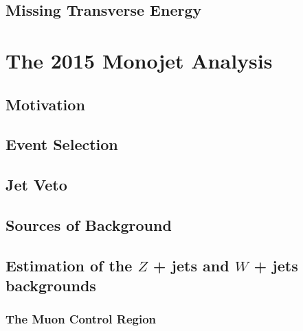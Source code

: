 \documentclass[10pt,twoside,cucitura,classica,english,openany]{toptesi}
\begin{document}


\section{Missing Transverse Energy}
\label{sec:miss-transv-energy}



\chapter{The 2015 Monojet Analysis}
\label{cha:monojet-signature}

\section{Motivation}
\label{sec:motivation}



\section{Event Selection}
\label{sec:event-selection}



\section{Jet Veto }
\label{sec:jet-veto}



\section{Sources of Background}
\label{sec:sources-background}



\section{Estimation of the $Z$ + jets and $W$ + jets backgrounds}
\label{sec:estimation-z-+}



\subsection{The Muon Control Region}
\label{sec:muon-control-region}


\end{document}
